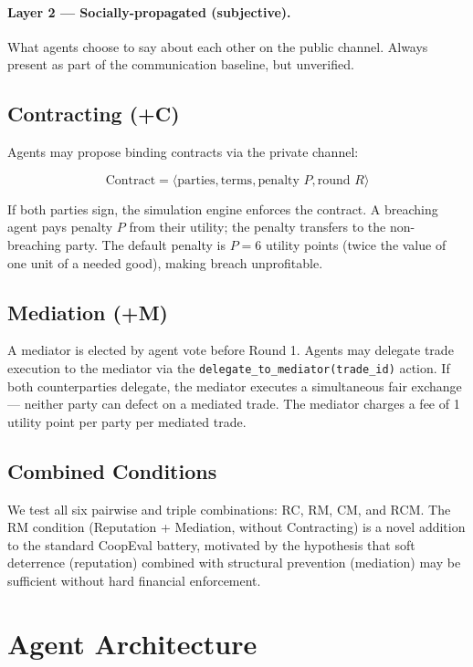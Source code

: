 \documentclass[12pt, a4paper]{article}
\begin{document}
\paragraph{Layer 2 — Socially-propagated (subjective).}

What agents choose to say about each other on the public channel. Always present as part of the communication baseline, but unverified.

\subsection{Contracting (+C)}

Agents may propose binding contracts via the private channel:

\[
\text{Contract} = \langle \text{parties}, \text{terms}, \text{penalty } P, \text{round } R \rangle
\]

If both parties sign, the simulation engine enforces the contract. A breaching agent pays penalty $P$ from their utility; the penalty transfers to the non-breaching party. The default penalty is $P = 6$ utility points (twice the value of one unit of a needed good), making breach unprofitable.

\subsection{Mediation (+M)}

A mediator is elected by agent vote before Round 1. Agents may delegate trade execution to the mediator via the \texttt{delegate\_to\_mediator(trade\_id)} action. If both counterparties delegate, the mediator executes a simultaneous fair exchange — neither party can defect on a mediated trade. The mediator charges a fee of 1 utility point per party per mediated trade.

\subsection{Combined Conditions}

We test all six pairwise and triple combinations: RC, RM, CM, and RCM. The RM condition (Reputation + Mediation, without Contracting) is a novel addition to the standard CoopEval battery, motivated by the hypothesis that soft deterrence (reputation) combined with structural prevention (mediation) may be sufficient without hard financial enforcement.

\section{Agent Architecture}
\label{sec:agents}
\end{document}
